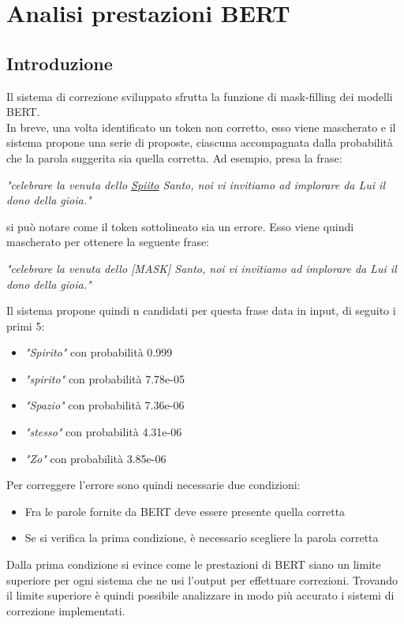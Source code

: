 \documentclass[12pt]{article}
\begin{document}
\maketitle
\newcommand{\E}{È}



\section{Analisi prestazioni BERT}
\subsection{Introduzione}
Il sistema di correzione sviluppato sfrutta la funzione di mask-filling dei modelli BERT. \\
In breve, una volta identificato un token non corretto, esso viene mascherato e il sistema propone una serie di proposte, ciascuna accompagnata dalla probabilità che la parola suggerita sia quella corretta.
Ad esempio, presa la frase:
\begin{center}
\textit{"celebrare la venuta dello \underline{Spiito} Santo, noi vi invitiamo ad implorare da Lui il dono della gioia."}
\end{center}
si può notare come il token sottolineato sia un errore. Esso viene quindi mascherato per ottenere la seguente frase:
\begin{center}
\textit{"celebrare la venuta dello [MASK] Santo, noi vi invitiamo ad implorare da Lui il dono della gioia."}
\end{center}
Il sistema propone quindi n candidati per questa frase data in input, di seguito i primi 5:
\begin{itemize}
\item  \textit{"Spirito"} con probabilità 0.999
\item  \textit{"spirito"} con probabilità 7.78e-05
\item  \textit{"Spazio"} con probabilità 7.36e-06
\item  \textit{"stesso"} con probabilità 4.31e-06
\item  \textit{"Zo"} con probabilità 3.85e-06
\end{itemize}
Per correggere l'errore sono quindi necessarie due condizioni:
\begin{itemize}
\item Fra le parole fornite da BERT deve essere presente quella corretta
\item Se si verifica la prima condizione, è necessario scegliere la parola corretta
\end{itemize}
Dalla prima condizione si evince come le prestazioni di BERT siano un limite superiore per ogni sistema che ne usi l'output per effettuare correzioni. Trovando il limite superiore è quindi possibile analizzare in modo più accurato i sistemi di correzione implementati.
\end{document}
